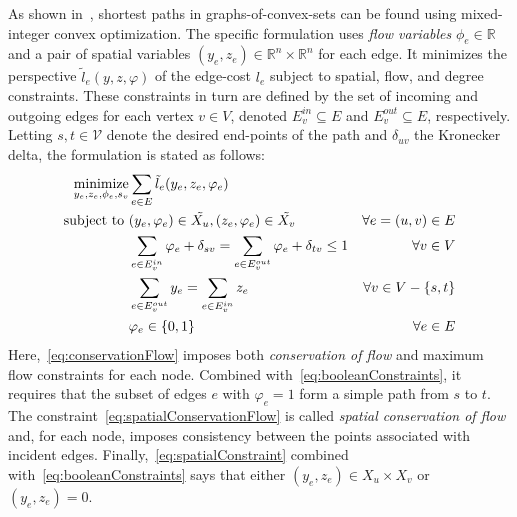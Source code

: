 \documentclass[letterpaper, 11pt]{article}
\begin{document}
As shown in~\cite{}, shortest paths in graphs-of-convex-sets  can be found using mixed-integer convex optimization.
The specific formulation uses \emph{flow variables} $\phi_e \in \mathbb{R}$ and a pair of spatial
variables $(y_e, z_e) \in \mathbb{R}^n \times \mathbb{R}^n$ for each edge.
It minimizes the perspective $\tilde l_e(y, z, \varphi)$ of the edge-cost $l_e$
subject to spatial, flow, and degree constraints.
These constraints in turn are defined by the set of incoming and outgoing edges for each vertex $v \in V$,
denoted $E^{in}_v \subseteq E$ and $E^{out}_v \subseteq E$, respectively.
Letting $s, t \in \mathcal{V}$ denote the desired end-points of the path and $\delta_{uv}$
the Kronecker delta, the formulation is stated as follows:
\begin{subequations}\label{eq:shortest_path}
  \begin{align}
  \operatorname*{minimize}_{y_e, z_e, \phi_e, s_v} &\sum_{e\in E}\tilde l_e(y_e, z_e, \varphi_e) \nonumber \\
  \mbox{subject to }  
  & (y_e, \varphi_e) \in \tilde{ X_u},    (z_e, \varphi_e) \in \tilde{ X_v}  &\forall  e=(u, v) \in E \label{eq:spatialConstraint}\\
  & \sum_{e \in E^{in}_v} \varphi_e + \delta_{sv} = \sum_{e \in E^{out}_v} \varphi_e + \delta_{tv} \le 1 &\forall v \in V  \label{eq:conservationFlow}\\
  & \sum_{e \in E^{out}_v} y_e = \sum_{e \in E^{in}_v} z_e &\forall v \in V - \{s, t\}   \label{eq:spatialConservationFlow}\\ 
  & \varphi_e \in \{0, 1\}  & \forall  e \in E  \label{eq:booleanConstraints}
  \end{align}
\end{subequations}
Here,~\eqref{eq:conservationFlow}  imposes both \emph{conservation of flow} and
maximum flow constraints for each node. Combined with~\eqref{eq:booleanConstraints},
it requires that the subset of edges $e$ with $\varphi_e = 1$ form a simple path from $s$ to $t$.
The constraint~\eqref{eq:spatialConservationFlow}
is called \emph{spatial conservation of flow} and, for each node, imposes consistency between
the points associated with incident  edges. Finally,~\eqref{eq:spatialConstraint} combined with~\eqref{eq:booleanConstraints}
says that either $(y_e, z_e) \in X_u \times X_v$  or $(y_e, z_e) = 0$.
\end{document}
